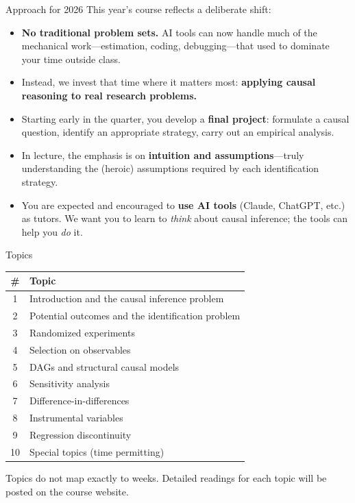 \documentclass[xcolor=dvipsnames]{beamer}
\begin{document}

\begin{frame}{Approach for 2026}
 This year's course reflects a deliberate shift: \\
\medskip
\small
\begin{itemize}
\item<2-> \textbf{No traditional problem sets.} AI tools can now handle much of the mechanical work---estimation, coding, debugging---that used to dominate your time outside class.
\medskip
\item<3-> Instead, we invest that time where it matters most: \textbf{applying causal reasoning to real research problems.}
\medskip
\item<4-> Starting early in the quarter, you develop a \textbf{final project}: formulate a causal question, identify an appropriate strategy, carry out an empirical analysis.
\medskip
\item<5-> In lecture, the emphasis is on \textbf{intuition and assumptions}---truly understanding the (heroic) assumptions required by each identification strategy.
\medskip
\item<6-> You are expected and encouraged to \textbf{use AI tools} (Claude, ChatGPT, etc.) as tutors. We want you to learn to \textit{think} about causal inference; the tools can help you \textit{do} it.
\end{itemize}
\end{frame}


\begin{frame}{Topics}
\begin{table}[ht]
\renewcommand{\arraystretch}{1.3}
\centering
\small
\begin{tabular}{c l}
\hline
\textbf{\#} & \textbf{Topic} \\
\hline
1 & Introduction and the causal inference problem \\
2 & Potential outcomes and the identification problem \\
3 & Randomized experiments \\
4 & Selection on observables \\
5 & DAGs and structural causal models \\
6 & Sensitivity analysis \\
7 & Difference-in-differences \\
8 & Instrumental variables \\
9 & Regression discontinuity \\
10 & Special topics (time permitting) \\
\hline
\end{tabular}
\end{table}
\medskip
\small
Topics do not map exactly to weeks. Detailed readings for each topic will be posted on the course website.
\end{frame}
\end{document}
